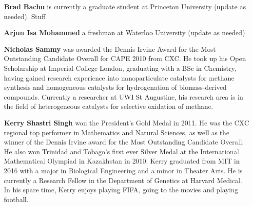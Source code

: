 \textbf{Brad Bachu} is currently a graduate student at Princeton
University (update as needed). Stuff

\vspace{5pt}

\noindent\textbf{Arjun Isa Mohammed} a freshman at Waterloo University
(update as needed)

\vspace{5pt}

\noindent\textbf{Nicholas Sammy} was awarded the Dennis Irvine Award for 
the Most Outstanding Candidate Overall for CAPE 2010 from CXC. He took up 
his Open Scholarship at Imperial College London, graduating with a BSc in Chemistry, having gained research experience into nanoparticulate catalysts 
for methane synthesis and homogeneous catalysts for hydrogenation of biomass-derived compounds. Currently a researcher at UWI St Augustine, his research 
area is in the field of heterogeneous catalysts for selective oxidation of methane.

\vspace{5pt}

\noindent\textbf{Kerry Shastri Singh} won the President's Gold Medal in 2011. He was the CXC regional top performer in Mathematics and Natural Sciences, as well as the winner of the Dennis Irvine award for the Most Outstanding Candidate Overall. He also won Trinidad and Tobago's first ever Silver Medal at the International Mathematical Olympiad in Kazakhstan in 2010. Kerry graduated from MIT in 2016 with a major in Biological Engineering and a minor in Theater Arts. He is currently a Research Fellow in the Department of Genetics at Harvard Medical. In his spare time, Kerry enjoys playing FIFA, going to the movies and playing football.
